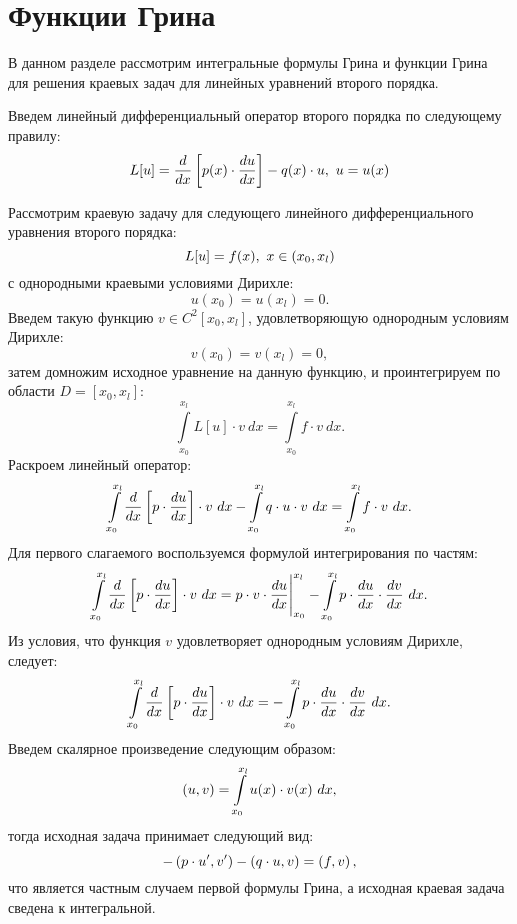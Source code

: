 \section{Функции Грина}

	В данном разделе рассмотрим интегральные формулы Грина и функции Грина для решения краевых задач для линейных уравнений второго порядка.

	Введем линейный дифференциальный оператор второго порядка по следующему правилу:
	\[ L[u] = \dfrac{d }{d x} \left[  p(x) \cdot \dfrac{d u}{d x}  \right] - q(x) \cdot u, ~ u = u(x) \]

	Рассмотрим краевую задачу для следующего линейного дифференциального уравнения второго порядка:
	\[ L[u] = f(x), ~ x \in \left( x_0, x_l \right) \]
	с однородными краевыми условиями Дирихле:
	\[ u(x_0) = u(x_l) = 0. \]
	Введем такую функцию $v \in C^2[x_0, x_l]$, удовлетворяющую однородным условиям Дирихле:
	\[ v(x_0) = v(x_l) = 0, \]
	затем домножим исходное уравнение на данную функцию, и проинтегрируем по области $D = [x_0, x_l]$:
	\[ \int\limits_{x_0}^{x_l} L[u] \cdot v ~ dx = \int\limits_{x_0}^{x_l} f \cdot v ~ dx. \]
	Раскроем линейный оператор:
	\[ \int\limits_{x_0}^{x_l} \dfrac{d }{d x} \left[ p \cdot \dfrac{d u}{d x} \right] \cdot v ~ dx - \int\limits_{x_0}^{x_l} q \cdot u \cdot v ~ dx = \int\limits_{x_0}^{x_l} f \cdot v ~ dx. \]
	Для первого слагаемого воспользуемся формулой интегрирования по частям:
	\[ \int\limits_{x_0}^{x_l} \dfrac{d }{d x} \left[ p \cdot \dfrac{d u}{d x} \right] \cdot v ~ dx = p \cdot v \cdot \dfrac{d u}{d x} \Biggl\vert \Biggr._{x_0}^{x_l} - \int\limits_{x_0}^{x_l} p \cdot \dfrac{d u}{d x} \cdot \dfrac{d v}{d x} ~ dx. \]
	Из условия, что функция $v$ удовлетворяет однородным условиям Дирихле, следует:
	\[ \int\limits_{x_0}^{x_l} \dfrac{d }{d x} \left[ p \cdot \dfrac{d u}{d x} \right] \cdot v ~ dx = - \int\limits_{x_0}^{x_l} p \cdot \dfrac{d u}{d x} \cdot \dfrac{d v}{d x} ~ dx. \]
	Введем скалярное произведение следующим образом:
	\[ \left( u, v \right) = \int\limits_{x_0}^{x_l} u(x) \cdot v(x) ~ dx, \]
	тогда исходная задача принимает следующий вид:
	\[ -\left( p \cdot u', v' \right) - \left( q \cdot u, v \right) = \left( f, v \right), \]
	что является частным случаем первой формулы Грина, а исходная краевая задача сведена к интегральной.

	\vspace{10pt}

